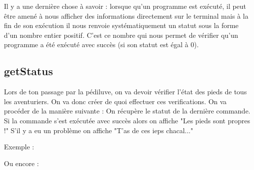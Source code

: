 \documentclass[a4paper, 12pt]{article}
\begin{document}
{    \vspace{0.6cm}
    
    \vspace{0.6cm}


    \vspace{2cm}
    Il y a une dernière chose à savoir : lorsque qu'un programme est exécuté, il peut être amené à nous afficher
    des informations directement sur le terminal mais à la fin de son exécution il nous renvoie systématiquement un statut
    sous la forme d'un nombre entier positif. C'est ce nombre qui nous permet de
    vérifier qu'un programme a été exécuté avec succès (si son statut est égal à 0).
    \vspace{4cm}

    \subsection{getStatus}

    Lors de ton passage par la pédiluve, on va devoir vérifier l'état des pieds de tous les
    aventuriers. On va donc créer de quoi effectuer ces verifications.
    \newline \newline
    On va procéder de la manière suivante :
    \newline \newline
    On récupère le statut de la dernière commande. Si la commande
    s'est exécutée avec succès alors on affiche "Les pieds sont propres !"
    S'il y a eu un problème on affiche "T'as de ces ieps chacal..."
    \newline \newline

    Exemple :


    Ou encore :

    
}
\end{document}
